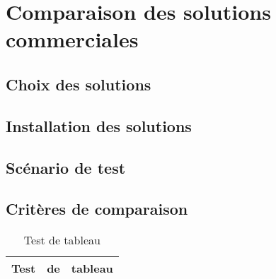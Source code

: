 \part{Comparaison des solutions commerciales}
\chapter{Choix des solutions}
\chapter{Installation des solutions}
\chapter{Scénario de test}
\chapter{Critères de comparaison}
\begin{table}[!ht]
\begin{tabular}{|c|c|c|}
\hline
Test & de & tableau\\
\hline
\end{tabular}
\caption{Test de tableau}
\end{table}
